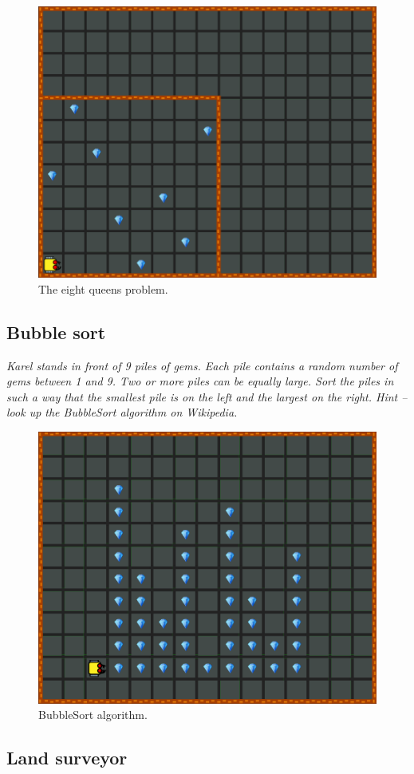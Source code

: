 {{\begin{figure}[!ht]
\begin{center}
\includegraphics[height=0.4\textwidth]{img/i04.png}
\end{center}
\vspace{-4mm}
\caption{The eight queens problem.}
\label{fig:g14}
\end{figure}

\newpage
\subsection{Bubble sort}

\noindent
{\em Karel stands in front of 9 piles of gems. Each pile contains a random number of gems between 1 and 9. 
Two or more piles can be equally large. Sort the piles in such a way that the smallest pile is on the left 
and the largest on the right. Hint -- look up the BubbleSort algorithm on Wikipedia.}

\begin{figure}[!ht]
\begin{center}
\includegraphics[height=0.4\textwidth]{img/i05.png}
\end{center}
\vspace{-4mm}
\caption{BubbleSort algorithm.}
\label{fig:g13}
\end{figure}

\newpage
\subsection{Land surveyor}

}}
